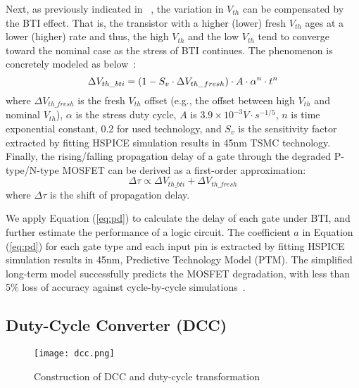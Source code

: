 Next, as previously indicated in~\cite{wang2010impact, gomez2016early} , the variation in $V_{th}$ can be compensated by the BTI effect. That is, the transistor with a higher (lower) fresh $V_{th}$ ages at a lower (higher) rate and thus, the high $V_{th}$ and the low $V_{th}$ tend to converge toward the nominal case as the stress of BTI continues. The phenomenon is concretely modeled as below~\cite{gomez2016early}:
\begin{equation}
	\centering
	\Delta V_{th\_bti} = (1 - S_{v} \cdot \Delta V_{th\_fresh})  \cdot A \cdot \alpha^n \cdot t^n
	\label{eq:cor}
\end{equation}
where $\Delta V_{th\_fresh}$ is the fresh $V_{th}$ offset (e.g., the offset between high $V_{th}$ and nominal $V_{th}$), $\alpha$ is the stress duty cycle, $A$ is $3.9 \times 10^{-3} V \cdot s^{-1/5}$, $n$ is time exponential constant, 0.2 for used technology, and $S_{v}$ is the sensitivity factor extracted by fitting HSPICE simulation results in 45nm TSMC technology.
Finally, the rising/falling propagation delay of a gate through the degraded P-type/N-type MOSFET can be derived as a first-order approximation:
\begin{equation}
	\label{eq:pd}
	\Delta \tau \propto \Delta V_{th\_bti} + \Delta V_{th\_fresh}
\end{equation}
where $\Delta \tau$ is the shift of propagation delay.

We apply Equation (\ref{eq:pd}) to calculate the delay of each gate under BTI, and further estimate the performance of a logic circuit. The coefficient $a$ in Equation (\ref{eq:pd}) for each gate type and each input pin is extracted by fitting HSPICE simulation results in 45nm, Predictive Technology Model (PTM). The simplified long-term model successfully predicts the MOSFET degradation, with less than 5\% loss of accuracy against cycle-by-cycle simulations~\cite{wang2007efficient, wang2010impact, gomez2016early, amrouch2016reliability}.

\subsection{Duty-Cycle Converter (DCC)}
\begin{figure}
    \centering
    \texttt{[image: dcc.png]} %
    \caption{Construction of DCC and duty-cycle transformation}
    \label{fig:dcc}
\end{figure}

